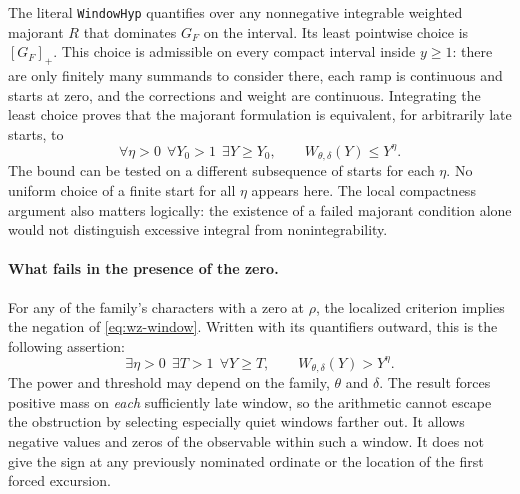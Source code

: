 \documentclass[12pt,letterpaper]{article}
\begin{document}
The literal \texttt{WindowHyp} quantifies over any nonnegative integrable weighted majorant \(R\) that dominates \(G_F\) on the interval. Its least pointwise choice is \([G_F]_+\). This choice is admissible on every compact interval inside \(y\ge1\): there are only finitely many summands to consider there, each ramp is continuous and starts at zero, and the corrections and weight are continuous. Integrating the least choice proves that the majorant formulation is equivalent, for arbitrarily late starts, to
\begin{equation}
 \forall\eta>0\ \ \forall Y_0>1\ \ \exists Y\ge Y_0,\qquad
 W_{\theta,\delta}(Y)\le Y^\eta.                             \label{eq:wz-window}
\end{equation}
The bound can be tested on a different subsequence of starts for each \(\eta\). No uniform choice of a finite start for all \(\eta\) appears here. The local compactness argument also matters logically: the existence of a failed majorant condition alone would not distinguish excessive integral from nonintegrability. 

\paragraph{What fails in the presence of the zero.}
For any of the family's characters with a zero at \(\rho\), the localized criterion implies the negation of \eqref{eq:wz-window}. Written with its quantifiers outward, this is the following assertion:
\begin{equation}
 \exists\eta>0\ \ \exists T>1\ \ \forall Y\ge T,\qquad
                         W_{\theta,\delta}(Y)>Y^\eta.           \label{eq:wz-force}
\end{equation}
The power and threshold may depend on the family, \(\theta\) and \(\delta\). The result forces positive mass on \emph{each} sufficiently late window, so the arithmetic cannot escape the obstruction by selecting especially quiet windows farther out. It allows negative values and zeros of the observable within such a window. It does not give the sign at any previously nominated ordinate or the location of the first forced excursion. 
\end{document}
